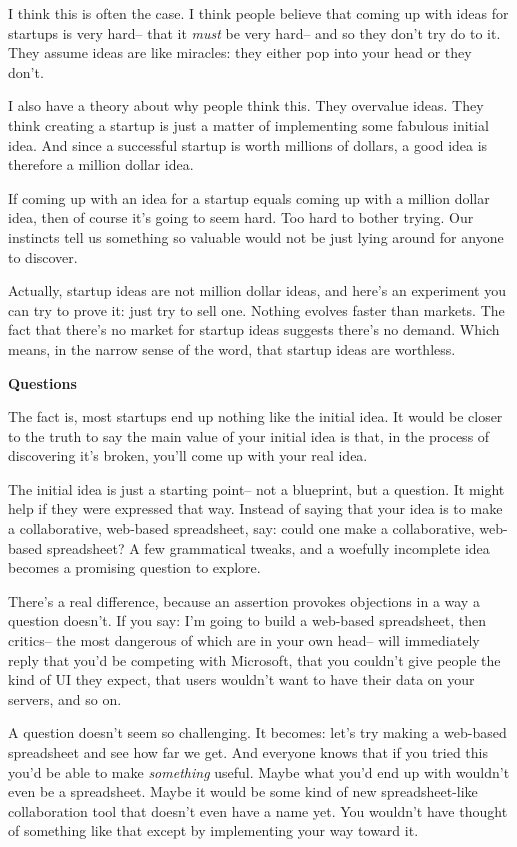 \documentclass[12pt]{book}
\begin{document}
I think this is often the case. I think people believe that coming up
with ideas for startups is very hard-- that it \emph{must} be very
hard-- and so they don't try do to it. They assume ideas are like
miracles: they either pop into your head or they don't.

I also have a theory about why people think this. They overvalue ideas.
They think creating a startup is just a matter of implementing some
fabulous initial idea. And since a successful startup is worth millions
of dollars, a good idea is therefore a million dollar idea.

If coming up with an idea for a startup equals coming up with a million
dollar idea, then of course it's going to seem hard. Too hard to bother
trying. Our instincts tell us something so valuable would not be just
lying around for anyone to discover.

Actually, startup ideas are not million dollar ideas, and here's an
experiment you can try to prove it: just try to sell one. Nothing
evolves faster than markets. The fact that there's no market for startup
ideas suggests there's no demand. Which means, in the narrow sense of
the word, that startup ideas are worthless.

\textbf{Questions}

The fact is, most startups end up nothing like the initial idea. It
would be closer to the truth to say the main value of your initial idea
is that, in the process of discovering it's broken, you'll come up with
your real idea.

The initial idea is just a starting point-- not a blueprint, but a
question. It might help if they were expressed that way. Instead of
saying that your idea is to make a collaborative, web-based spreadsheet,
say: could one make a collaborative, web-based spreadsheet? A few
grammatical tweaks, and a woefully incomplete idea becomes a promising
question to explore.

There's a real difference, because an assertion provokes objections in a
way a question doesn't. If you say: I'm going to build a web-based
spreadsheet, then critics-- the most dangerous of which are in your own
head-- will immediately reply that you'd be competing with Microsoft,
that you couldn't give people the kind of UI they expect, that users
wouldn't want to have their data on your servers, and so on.

A question doesn't seem so challenging. It becomes: let's try making a
web-based spreadsheet and see how far we get. And everyone knows that if
you tried this you'd be able to make \emph{something} useful. Maybe what
you'd end up with wouldn't even be a spreadsheet. Maybe it would be some
kind of new spreadsheet-like collaboration tool that doesn't even have a
name yet. You wouldn't have thought of something like that except by
implementing your way toward it.
\end{document}
